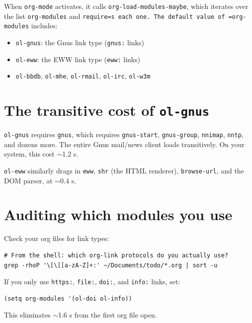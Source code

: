 When \texttt{org-mode} activates, it calls \texttt{org-load-modules-maybe}, which iterates over the list \texttt{org-modules} and \texttt{require=s each one.  The default value of =org-modules} includes:

\begin{itemize}
\item \texttt{ol-gnus}: the Gnus link type (\texttt{gnus:} links)
\item \texttt{ol-eww}: the EWW link type (\texttt{eww:} links)
\item \texttt{ol-bbdb}, \texttt{ol-mhe}, \texttt{ol-rmail}, \texttt{ol-irc}, \texttt{ol-w3m}
\end{itemize}

\section{The transitive cost of \texttt{ol-gnus}}\label{the-transitive-cost-of-ol-gnus}

\texttt{ol-gnus} requires \texttt{gnus}, which requires \texttt{gnus-start}, \texttt{gnus-group}, \texttt{nnimap}, \texttt{nntp}, and dozens more. The entire Gnus mail/news client loads transitively. On your system, this cost \(\sim\)1.2 s.

\texttt{ol-eww} similarly drags in \texttt{eww}, \texttt{shr} (the HTML renderer), \texttt{browse-url}, and the DOM parser, at \(\sim\)0.4 s.

\section{Auditing which modules you use}\label{auditing-which-modules-you-use}

Check your org files for link types:

\begin{verbatim}
# From the shell: which org-link protocols do you actually use?
grep -rhoP '\[\[[a-zA-Z]+:' ~/Documents/todo/*.org | sort -u
\end{verbatim}

If you only use \texttt{https:}, \texttt{file:}, \texttt{doi:}, and \texttt{info:} links, set:

\begin{verbatim}
(setq org-modules '(ol-doi ol-info))
\end{verbatim}

This eliminates \(\sim\)1.6 s from the first org file open.

